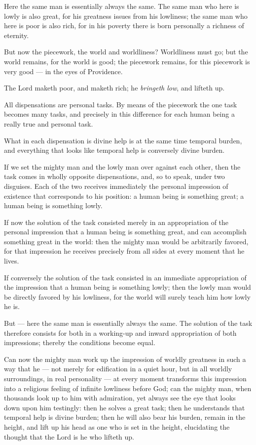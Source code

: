 \documentclass[12pt,a4paper,openany]{book}
\newcommand{\opage}[1]{\marginnote{\footnotesize\textit{[#1]}}}
\begin{document}
Here the same man is essentially always the
\setcounter{footnote}{0}%
\opage{58}same. The same man who here is lowly is
also great, for his greatness issues from
his lowliness; the same man who here is poor
is also rich, for in his poverty there is born personally
a richness of eternity.

But now the piecework, the world and worldliness?
Worldliness must go; but the world
remains, for the world is good; the piecework remains,
for this piecework is very good --- in the eyes of
Providence.

The Lord maketh poor, and
maketh rich; he \emph{bringeth low}, and lifteth up.

All dispensations are personal tasks. By means of
the piecework the one task becomes
many tasks, and precisely in this difference
for each human being a really true and personal
task.

What in each dispensation is divine
help is at the same time temporal burden, and everything
that looks like temporal help is conversely
divine burden.

If we set the mighty man and the lowly man over against
each other, then the task comes in wholly opposite
dispensations, and, so to speak, under two 
\setcounter{footnote}{0}%
\opage{59}disguises. Each of the two receives immediately
the personal impression of existence
that corresponds to his position: a human being is
something great; a human being is something lowly.

If now the solution of the task consisted merely
in an appropriation of the personal impression that a
human being is something great, and can accomplish something
great in the world: then the mighty man would be arbitrarily
favored, for that impression he receives
precisely from all sides at every moment that he lives.

If conversely the solution of the task consisted
in an immediate appropriation of the impression that
a human being is something lowly; then the lowly man
would be directly favored by his lowliness, for
the world will surely teach him how lowly he is.

But --- here the same man is essentially always
the same. The solution of the task therefore consists for both in a working-up and
inward appropriation of both impressions; thereby the conditions
become equal.

Can now the mighty man work up the impression
of worldly greatness in such a way that he --- not
merely for edification in a quiet hour, but in all
worldly surroundings, in real personality --- at
every moment transforms this impression into a religious
\setcounter{footnote}{0}%
\opage{60}feeling of infinite lowliness before God; can the
mighty man, when thousands look up to him with admiration,
yet always see the eye that looks down upon him
testingly: then he solves a great task;
then he understands that temporal help is divine
burden; then he will also bear his burden,
remain in the height, and lift up his head as one
who is set in the height, elucidating the thought
that the Lord is he who lifteth up.
\end{document}
